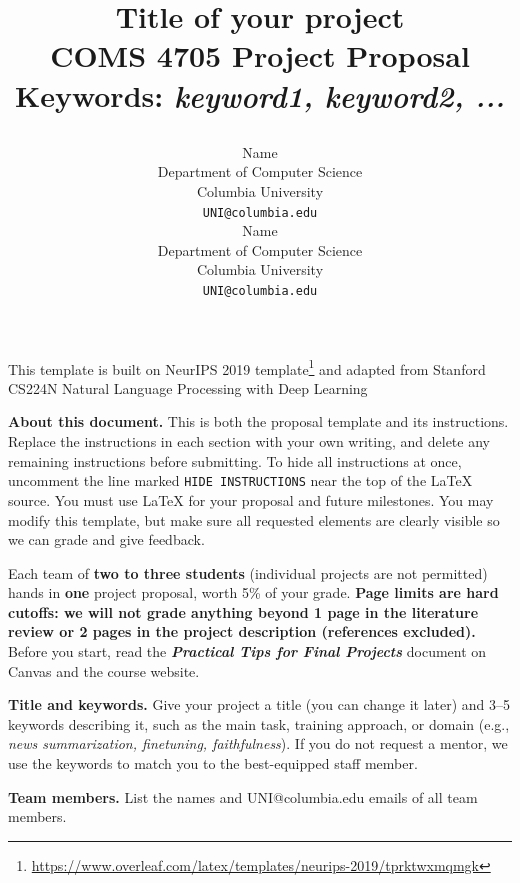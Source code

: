 \documentclass{article}
\title{
  Title of your project \\
  \vspace{1em}
  \small{\normalfont COMS 4705 Project Proposal}  \\
  \small{\normalfont \textbf{Keywords:} \textit{keyword1, keyword2, ...}}

}
\author{
  Name \\
  Department of Computer Science \\
  Columbia University \\
  \texttt{UNI@columbia.edu} \\
  \And
  Name \\
  Department of Computer Science \\
  Columbia University \\
  \texttt{UNI@columbia.edu} \\
}
\newcommand{\note}[1]{#1}
\begin{document}
\maketitle


\note{\begin{center}
    This template is built on NeurIPS 2019 template\footnote{\url{https://www.overleaf.com/latex/templates/neurips-2019/tprktwxmqmgk}} and adapted from Stanford CS224N Natural Language Processing with Deep Learning
\end{center}}

\begin{instructions}
\textbf{About this document.} This is both the proposal template and its instructions. Replace the instructions in each section with your own writing, and delete any remaining instructions before submitting. To hide all instructions at once, uncomment the line marked \texttt{HIDE INSTRUCTIONS} near the top of the \LaTeX{} source. You must use \LaTeX{} for your proposal and future milestones. You may modify this template, but make sure all requested elements are clearly visible so we can grade and give feedback.

Each team of \textbf{two to three students} (individual projects are not permitted) hands in \textbf{one} project proposal, worth 5\% of your grade. \textbf{Page limits are hard cutoffs: we will not grade anything beyond 1 page in the literature review or 2 pages in the project description (references excluded).} Before you start, read the \textit{\textbf{Practical Tips for Final Projects}} document on Canvas and the course website.

\textbf{Title and keywords.} Give your project a title (you can change it later) and 3--5 keywords describing it, such as the main task, training approach, or domain (e.g., \textit{news summarization, finetuning, faithfulness}). If you do not request a mentor, we use the keywords to match you to the best-equipped staff member.

\textbf{Team members.} List the names and UNI@columbia.edu emails of all team members.
\end{instructions}
\end{document}

